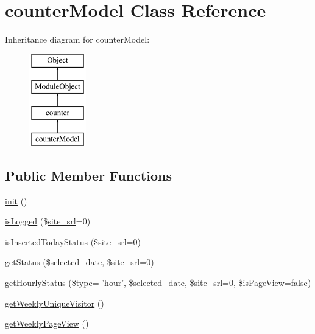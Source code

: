 \hypertarget{classcounterModel}{\section{counter\-Model Class Reference}
\label{classcounterModel}
}
Inheritance diagram for counter\-Model\-:\begin{figure}[H]
\begin{center}
\leavevmode
\includegraphics[height=4.000000cm]{classcounterModel}
\end{center}
\end{figure}
\subsection*{Public Member Functions}
\begin{DoxyCompactItemize}
\item 
\hyperlink{classcounterModel_a3131ee0122d97e0b7d39d6d31a7227dc}{init} ()
\item 
\hyperlink{classcounterModel_a8d9351da08e33d6f47f8645d87ec9380}{is\-Logged} (\$\hyperlink{ko_8install_8php_a8b1406b4ad1048041558dce6bfe89004}{site\-\_\-srl}=0)
\item 
\hyperlink{classcounterModel_ad2e64d22eb37f58e91a37ebb1f421d35}{is\-Inserted\-Today\-Status} (\$\hyperlink{ko_8install_8php_a8b1406b4ad1048041558dce6bfe89004}{site\-\_\-srl}=0)
\item 
\hyperlink{classcounterModel_a83bc31a1c941d3972dba6eae69eab1f6}{get\-Status} (\$selected\-\_\-date, \$\hyperlink{ko_8install_8php_a8b1406b4ad1048041558dce6bfe89004}{site\-\_\-srl}=0)
\item 
\hyperlink{classcounterModel_a165e5f486e0b11e9f61f39ecf0f500eb}{get\-Hourly\-Status} (\$type= 'hour', \$selected\-\_\-date, \$\hyperlink{ko_8install_8php_a8b1406b4ad1048041558dce6bfe89004}{site\-\_\-srl}=0, \$is\-Page\-View=false)
\item 
\hyperlink{classcounterModel_ad43ae0f93cd42e9a59262abfe296fb9a}{get\-Weekly\-Unique\-Visitor} ()
\item 
\hyperlink{classcounterModel_a026465ce135cfff7827d869f1adaeb83}{get\-Weekly\-Page\-View} ()
\end{DoxyCompactItemize}
